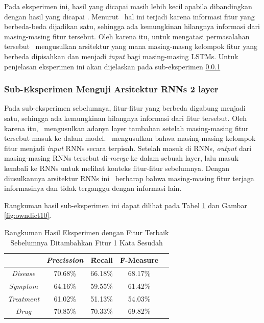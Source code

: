     Pada eksperimen ini, hasil yang dicapai masih lebih kecil apabila dibandingkan dengan hasil yang dicapai \cite{skripsiKakRadit}. Menurut \saya~hal ini terjadi karena informasi fitur yang berbeda-beda dijadikan satu, sehingga ada kemungkinan hilangnya informasi dari masing-masing fitur tersebut. Oleh karena itu, untuk mengatasi permasalahan tersebut \saya~mengusulkan arsitektur yang mana masing-masng kelompok fitur yang berbeda dipisahkan dan menjadi \textit{input} bagi masing-masing LSTMs. Untuk penjelasan eksperimen ini akan dijelaskan pada sub-eksperimen \ref{eks2:subeksrnn2}
    
    
    \subsubsection{Sub-Eksperimen Menguji Arsitektur RNNs 2 layer}\label{eks2:subeksrnn2}
    Pada sub-eksperimen sebelumnya, fitur-fitur yang berbeda digabung menjadi satu, sehingga ada kemungkinan hilangnya informasi dari fitur tersebut. Oleh karena itu, \saya~mengusulkan adanya layer tambahan setelah masing-masing fitur tersebut masuk ke dalam model. \Saya~mengusulkan bahwa masing-masing kelompok fitur menjadi \textit{input} RNNs secara terpisah. Setelah masuk di RNNs, \textit{output} dari masing-masing RNNs tersebut di-\textit{merge} ke dalam sebuah layer, lalu masuk kembali ke RNNs untuk melihat konteks fitur-fitur sebelumnya. Dengan diusulkannya arsitektur RNNs ini \saya~berharap bahwa masing-masing fitur terjaga informasinya dan tidak terganggu dengan informasi lain.
    
    Rangkuman hasil sub-eksperimen ini dapat dilihat pada Tabel \ref{table:owndict10} dan Gambar \ref{fig:owndict10}.
    
    \begin{table}
    	\centering
    	\caption{Rangkuman Hasil Eksperimen dengan Fitur Terbaik Sebelumnya Ditambahkan Fitur 1 Kata Sesudah}
    	\begin{tabular}{|c|c|c|c|c|}
    		\hline
    		& \textit{Precission} & \f{\f{Recall}} & \f{\f{F-Measure}} \\ \hline
    		\textit{Disease}      & 70.68\%             & 66.18\%        & 68.17\%           \\ \hline
    		\textit{Symptom}      & 64.16\%             & 59.55\%        & 61.42\%           \\ \hline
    		\textit{Treatment}    & 61.02\%             & 51.13\%        & 54.03\%           \\ \hline
    		\textit{Drug}		  & 70.85\%             & 70.33\%        & 69.82\%           \\ \hline
    	\end{tabular}
    	\label{table:owndict10}
    \end{table}
    
